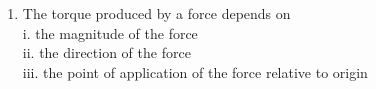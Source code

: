 \documentclass[11pt,a4paper]{article}
\begin{document}
\begin{enumerate}
{i. a force is required to move the body upwards \\

ii. a force is required to move the body downward \\

iii. the body will not be in equilibrium \\

The correct answer is}
\begin{enumerate}[label=\Alph*.]
\item{only (i)}
\item{only (ii)}
\item{both (i) and (ii)}
\item{both (i) and (iii)}
\end{enumerate}
\item{The torque produced by a force depends on \\

i. the magnitude of the force \\

ii. the direction of the force \\

iii. the point of application of the force relative to origin  \\

}
\end{enumerate}
\end{document}
